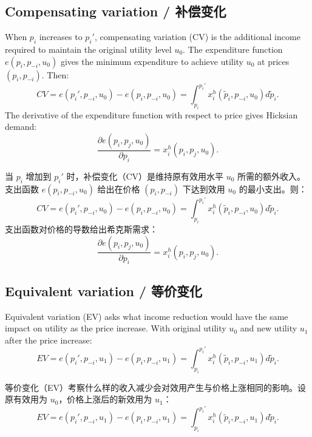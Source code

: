 \subsection{Compensating variation / 补偿变化}

\begin{original}
When $p_i$ increases to $p_i'$, compensating variation (CV) is the additional income required to maintain the original utility level $u_0$. The expenditure function $e(p_i, p_{-i}, u_0)$ gives the minimum expenditure to achieve utility $u_0$ at prices $(p_i, p_{-i})$. Then:
\[
CV = e(p_i', p_{-i}, u_0) - e(p_i, p_{-i}, u_0) = \int_{p_i}^{p_i'} x_i^h(\tilde{p}_i, p_{-i}, u_0) d\tilde{p}_i. \tag{14.14}
\]
The derivative of the expenditure function with respect to price gives Hicksian demand:
\[
\frac{\partial e(p_i, p_j, u_0)}{\partial p_i} = x_i^h(p_i, p_j, u_0). \tag{14.11}
\]
\end{original}
\begin{translation}
当 $p_i$ 增加到 $p_i'$ 时，补偿变化（CV）是维持原有效用水平 $u_0$ 所需的额外收入。支出函数 $e(p_i, p_{-i}, u_0)$ 给出在价格 $(p_i, p_{-i})$ 下达到效用 $u_0$ 的最小支出。则：
\[
CV = e(p_i', p_{-i}, u_0) - e(p_i, p_{-i}, u_0) = \int_{p_i}^{p_i'} x_i^h(\tilde{p}_i, p_{-i}, u_0) d\tilde{p}_i. \tag{14.14}
\]
支出函数对价格的导数给出希克斯需求：
\[
\frac{\partial e(p_i, p_j, u_0)}{\partial p_i} = x_i^h(p_i, p_j, u_0). \tag{14.11}
\]
\end{translation}

\subsection{Equivalent variation / 等价变化}

\begin{original}
Equivalent variation (EV) asks what income reduction would have the same impact on utility as the price increase. With original utility $u_0$ and new utility $u_1$ after the price increase:
\[
EV = e(p_i', p_{-i}, u_1) - e(p_i, p_{-i}, u_1) = \int_{p_i}^{p_i'} x_i^h(\tilde{p}_i, p_{-i}, u_1) d\tilde{p}_i. \tag{14.20}
\]
\end{original}
\begin{translation}
等价变化（EV）考察什么样的收入减少会对效用产生与价格上涨相同的影响。设原有效用为 $u_0$，价格上涨后的新效用为 $u_1$：
\[
EV = e(p_i', p_{-i}, u_1) - e(p_i, p_{-i}, u_1) = \int_{p_i}^{p_i'} x_i^h(\tilde{p}_i, p_{-i}, u_1) d\tilde{p}_i. \tag{14.20}
\]
\end{translation}

